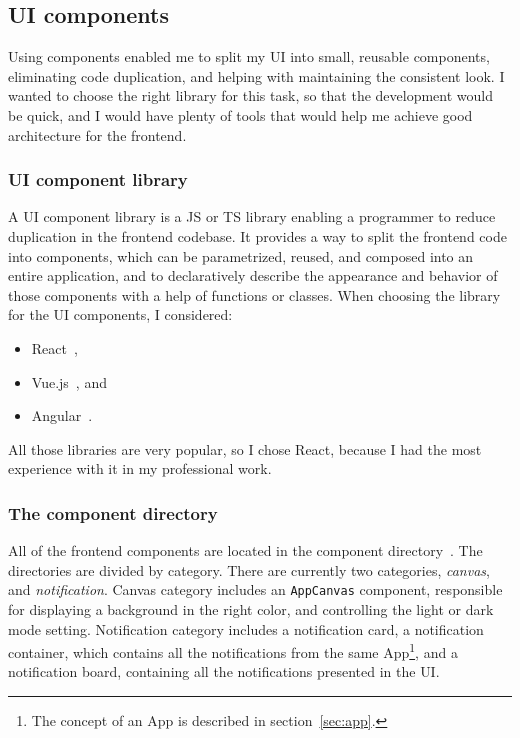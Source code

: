 \subsection{UI components}\label{sec:ui-components}

Using components enabled me to split my \ac{UI}
into small, reusable components,
eliminating code duplication,
and helping with maintaining the consistent look.
I wanted to choose the right library
for this task,
so that the development would be quick,
and I would have plenty of tools
that would help me achieve
good architecture for the frontend.

\subsubsection{UI component library}\label{sec:ui-component-library}

A \ac{UI} component library is a \acf{JS} or \acf{TS} library
enabling a programmer to reduce duplication
in the frontend codebase.
It provides a way to split the frontend code into components,
which can be parametrized, reused, and composed into an entire application,
and to declaratively describe
the appearance and behavior of those components
with a help of functions or classes.
When choosing the library for the \ac{UI} components, I considered:

\begin{itemize}
  \item
        React~\cite{oshannessy_react_2022},
  \item
        Vue.js~\cite{you_vuejs_2022}, and
  \item
        Angular~\cite{kalpakas_angular_2022}.
\end{itemize}

All those libraries are very popular,
so I chose React,
because I had the most experience with it in my professional work.

\subsubsection{The component directory}\label{sec:the-component-directory}

All of the frontend components
are located in the component directory~\cite{sewera_notipie_2022-3}.
The directories are divided by category.
There are currently two categories,
\textit{canvas}, and
\textit{notification}.
Canvas category includes
an \texttt{AppCanvas} component,
responsible for displaying
a background in the right color,
and controlling the light or dark mode setting.
Notification category includes
a notification card,
a notification container,
which contains all the notifications
from the same App\footnote{
  The concept of an App is described
  in section~\ref{sec:app}.
}, and a notification board,
containing all the notifications
presented in the \ac{UI}.


